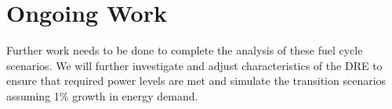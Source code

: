 \section{Ongoing Work}
Further work needs to be done to complete the analysis 
of these fuel cycle scenarios. We will further investigate 
and adjust characteristics of the \gls{DRE} to 
ensure that required power levels are met and simulate 
the transition scenarios assuming 1\% growth in energy 
demand.  